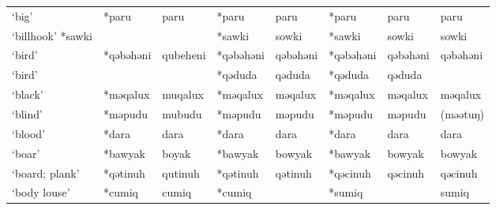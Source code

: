 \begin{landscape}
\begin{longtable}[c]{@{}p{3cm}<{\raggedright}p{2.75cm}<{\raggedright}p{2.75cm}<{\raggedright}p{2.75cm}<{\raggedright}p{2.75cm}<{\raggedright}p{2.75cm}<{\raggedright}p{2.75cm}<{\raggedright}p{2.75cm}<{\raggedright}@{}}
`big'                                                & *paru              & paru                           & *paru              & paru                       & *paru            & paru                     & paru                              \\
`billhook'                         *sawki            &                    &                                & *sawki             & sowki                      & *sawki           & sowki                    & sowki                             \\
`bird'                                               & *qəbəhəni          & qubeheni                       & *qəbəhəni          & qəbəhəni                   & *qəbəhəni        & qəbəhəni                 & qəbəhəni                          \\
`bird'                                               &                    &                                & *qəduda            & qəduda                     & *qəduda          & qəduda                   &                                   \\
`black'                                              & *məqalux           & muqalux                        & *məqalux           & məqalux                    & *məqalux         & məqalux                  & məqalux                           \\
`blind'                                              & *məpudu            & mubudu                         & *məpudu            & məpudu                     & *məpudu          & məpudu                   & (məətuŋ)                          \\
`blood'                                              & *dara              & dara                           & *dara              & dara                       & *dara            & dara                     & dara                              \\
`boar'                                               & *bawyak            & boyak                          & *bawyak            & bowyak                     & *bawyak          & bowyak                   & bowyak                            \\
`board; plank'                                       & *qətinuh           & qutinuh                        & *qətinuh           & qətinuh                    & *qəcinuh         & qəcinuh                  & qəcinuh                           \\
`body louse'                                         & *cumiq             & cumiq                          & *cumiq             &                            & *sumiq           &                          & sumiq                             \\

\end{longtable}
\end{landscape}
